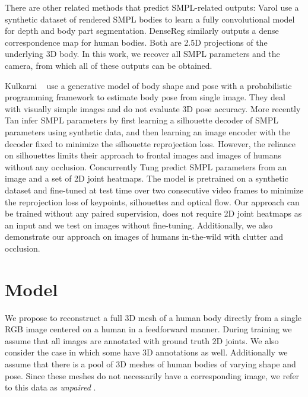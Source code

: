 \documentclass[10pt,twocolumn,letterpaper]{article}
\begin{document}
There are other related methods that predict SMPL-related outputs:
Varol \etal \cite{Gul} use a synthetic
dataset of rendered SMPL bodies to learn a fully convolutional model
for depth and body part segmentation. 
DenseReg \cite{DenseReg} similarly outputs a dense
correspondence map for human bodies. Both are 2.5D projections of the
underlying 3D body. In this work, we recover all SMPL parameters
and the camera, from which all of these outputs can be obtained.

Kulkarni \etal~\cite{Kulkarni_2015_CVPR} use a generative model of body shape
and pose with a probabilistic programming framework to
estimate body pose from single image. They deal with visually simple
images and do not evaluate 3D pose accuracy. More recently Tan \etal \cite{Tan} infer SMPL 
parameters by first learning a silhouette decoder of SMPL
parameters using synthetic data, and then learning an image encoder with the
 decoder fixed to minimize the silhouette reprojection loss. However, the reliance on
 silhouettes limits their approach to frontal images and images of humans without any occlusion. 
Concurrently Tung \etal \cite{tung2017self} predict SMPL
parameters from an image and a set of 2D joint heatmaps. The model is pretrained on a synthetic dataset and fine-tuned at test
time over two consecutive video frames to minimize the reprojection loss of keypoints, silhouettes and optical
flow. Our approach can be trained without any paired
supervision, does not require 2D joint heatmaps as an input and we test on
images without fine-tuning. Additionally, we also demonstrate our approach
on images of humans in-the-wild
\cite{coco} with clutter and occlusion.


 \section{Model}
We propose to reconstruct a full 3D mesh of a human body directly from a single RGB
image  centered on a human in a feedforward manner. During training we assume that all
images are annotated with ground truth 2D joints.
We also consider the case in which some have 3D annotations
as well. 
Additionally we assume that there is a pool of 3D meshes of
human bodies of varying shape and pose. 
Since these meshes do not necessarily have a corresponding image,
we refer to this data as \emph{unpaired} \cite{CycleGAN2017}. 
\end{document}
